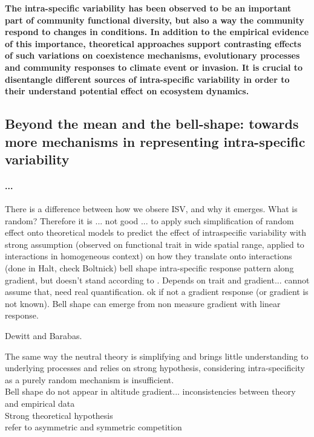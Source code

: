 \textbf{The intra-specific variability has been observed to be an important part of community functional diversity, but also a way the community respond to changes in conditions. In addition to the empirical evidence of this importance, theoretical approaches support contrasting effects of such variations on coexistence mechanisms, evolutionary processes and community responses to climate event or invasion. It is crucial to disentangle different sources of intra-specific variability in order to their understand potential effect on ecosystem dynamics.}

\subsection{Beyond the mean and the bell-shape: towards more mechanisms in representing intra-specific variability}

\paragraph{...}
There is a difference between how we obsere ISV, and why it emerges. What is random? Therefore it is  ... not good ... to apply such simplification of random effect onto theoretical models to predict the effect of intraspecific variability with strong assumption (observed on functional trait in wide spatial range, applied to interactions in homogeneous context) on how they translate onto interactions (done in Halt, check Boltnick) 
\cite{albert_intraspecific_2010} bell shape intra-specific response pattern along gradient, but doesn't stand according to \cite{kichenin_contrasting_2013}. Depends on trait and gradient... cannot assume that, need real quantification. ok if not a gradient response (or gradient is not known).
Bell shape can emerge from non measure gradient with linear response. 

Dewitt and Barabas.

The same way the neutral theory is simplifying and brings little understanding to underlying processes and relies on strong hypothesis, considering intra-specificity as a purely random mechanism is insufficient.\\
Bell shape do not appear in altitude gradient... inconsistencies between theory and empirical data\\
Strong theoretical hypothesis\\
refer to asymmetric and symmetric competition\\

